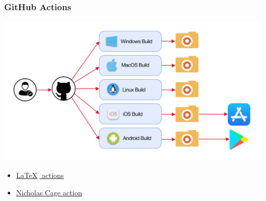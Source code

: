 \begin{frame}
    \frametitle{GitHub Actions}
    \centering

    \includegraphics[width=\textwidth]{Bin/github_actions.png}

    \pause
    
    \begin{itemize}
        \item \href{https://github.com/11michalis11/ED-EMS-game-paper}{\LaTeX \(\;\) actions}
        \item \href{https://twitter.com/tartanllama/status/1163927778376462337}{Nicholas Cage action}
    \end{itemize}

\end{frame}

